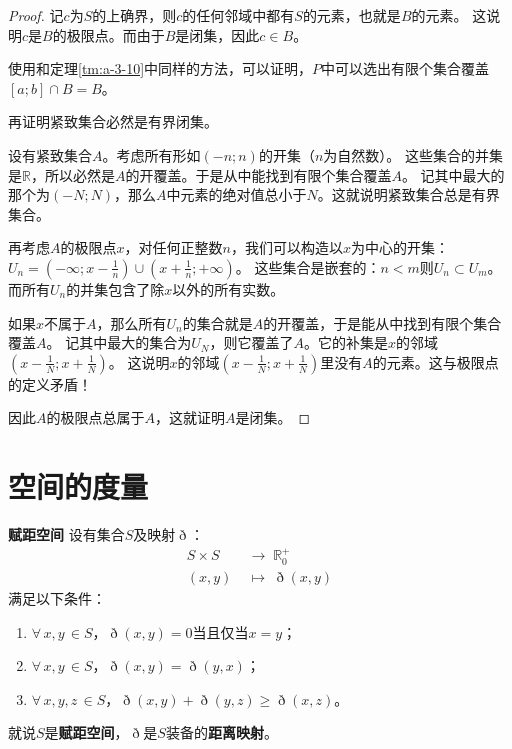 \documentclass[12pt,UTF8,fontset=none]{ctexbook}
\begin{document}
\begin{appendix}
\begin{proof}
    记$c$为$S$的上确界，则$c$的任何邻域中都有$S$的元素，也就是$B$的元素。
    这说明$c$是$B$的极限点。而由于$B$是闭集，因此$c\in B$。

    使用和定理\ref{tm:a-3-10}中同样的方法，可以证明，$P$中可以选出有限个集合覆盖$[a;b]\cap B = B$。

    再证明紧致集合必然是有界闭集。

    设有紧致集合$A$。考虑所有形如$(-n;n)$的开集（$n$为自然数）。
    这些集合的并集是$\mathbb{R}$，所以必然是$A$的开覆盖。于是从中能找到有限个集合覆盖$A$。
    记其中最大的那个为$(-N;N)$，那么$A$中元素的绝对值总小于$N$。这就说明紧致集合总是有界集合。

    再考虑$A$的极限点$x$，对任何正整数$n$，我们可以构造以$x$为中心的开集：$\displaystyle U_n = \left(-\infty;x-\frac{1}{n}\right)\cup\left(x+\frac{1}{n};+\infty\right)$。
    这些集合是嵌套的：$n<m$则$U_n\subset U_m$。而所有$U_n$的并集包含了除$x$以外的所有实数。

    如果$x$不属于$A$，那么所有$U_n$的集合就是$A$的开覆盖，于是能从中找到有限个集合覆盖$A$。
    记其中最大的集合为$U_N$，则它覆盖了$A$。它的补集是$x$的邻域$\displaystyle\left(x-\frac{1}{N};x+\frac{1}{N}\right)$。
    这说明$x$的邻域$\displaystyle\left(x-\frac{1}{N};x+\frac{1}{N}\right)$里没有$A$的元素。这与极限点的定义矛盾！
    
    因此$A$的极限点总属于$A$，这就证明$A$是闭集。

\end{proof}

\chapter{空间的度量}

\begin{df}{\textbf{赋距空间}}
    设有集合$S$及映射$\eth$：
    \begin{align*}
        S\times S \;&\rightarrow \; \mathbb{R}_0^+ \\
        (x, y) \;&\mapsto \; \eth(x, y)
    \end{align*}
    满足以下条件：
    \begin{enumerate}
        \item $\forall \, x, y\, \in S$，$\eth(x, y) = 0$当且仅当$x = y$；
        \item $\forall \, x, y\, \in S$，$\eth(x, y) = \eth(y, x)$；
        \item $\forall \, x, y, z\, \in S$，$\eth(x, y) + \eth(y, z) \geqslant \eth (x, z)$。
    \end{enumerate}
    就说$S$是\textbf{赋距空间}，$\eth$是$S$装备的\textbf{距离映射}。
\end{df}


\end{appendix}
\end{document}
